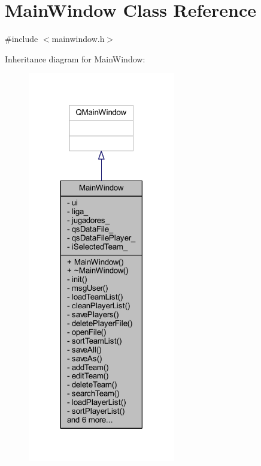 \hypertarget{class_main_window}{}\section{Main\+Window Class Reference}
\label{class_main_window}


{\ttfamily \#include $<$mainwindow.\+h$>$}



Inheritance diagram for Main\+Window\+:
\nopagebreak
\begin{figure}[H]
\begin{center}
\leavevmode
\includegraphics[width=182pt]{de/d4b/class_main_window__inherit__graph}
\end{center}
\end{figure}


